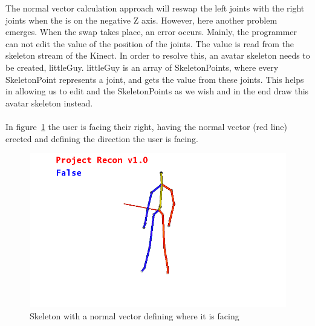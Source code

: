 
The normal vector calculation approach will reswap the left joints with the right joints when the \N is on the negative Z axis. 
However, here another problem emerges. When the swap takes place, an error occurs. Mainly, the programmer can not 
edit the value of the position of the joints. The value is read from the skeleton 
stream of the Kinect. In order to resolve this, an avatar skeleton needs to be 
created, littleGuy. littleGuy is an array of SkeletonPoints, where every 
SkeletonPoint represents a joint, and gets the value from these joints. This 
helps in allowing us to edit and the SkeletonPoints as we wish and in the end 
draw this avatar skeleton instead.
\\
\\
In figure~\ref{skeletonnormal} the user is facing their right, having the normal vector (red 
line) erected and defining the direction the user is facing.

\begin{figure}[!htbp]
\centering
\includegraphics[width=1\textwidth]{images/skeleton_normal.png}
\caption{Skeleton with a normal vector defining where it is facing}
\label{skeletonnormal}
\end{figure}

